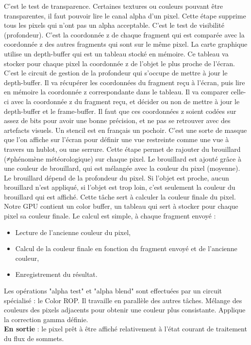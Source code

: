 C’est le test de transparence. Certaines textures ou couleurs pouvant être transparentes, il faut pouvoir lire le canal alpha d’un pixel. Cette étape supprime tous les pixels qui n’ont pas un alpha acceptable.
C’est le test de visibilité (profondeur). C’est la coordonnée z de chaque fragment qui est comparée avec la coordonnée z des autres fragments qui sont sur le même pixel. La carte graphique utilise un depth-buffer qui est un tableau stocké en mémoire. Ce tableau va stocker pour chaque pixel la coordonnée z de l’objet le plus proche de l’écran.
C’est le circuit de gestion de la profondeur qui s’occupe de mettre à jour le depth-buffer. Il va récupérer les coordonnées du fragment reçu à l’écran, puis lire en mémoire la coordonnée z correspondante dans le tableau. Il va comparer celle-ci avec la coordonnée z du fragment reçu, et décider ou non de mettre à jour le depth-buffer et le frame-buffer.
Il faut que ces coordonnées z soient codées sur assez de bits pour avoir une bonne précision, et ne pas se retrouver avec des artefacts visuels.
Un stencil est en  français un pochoir. C’est une sorte de masque que l’on affiche sur l’écran pour définir une vue restreinte comme une vue à travers un hublot, ou une serrure.
Cette étape permet de rajouter du brouillard (≠phénomène météorologique) sur chaque pixel. Le brouillard est ajouté grâce à une couleur de brouillard, qui est mélangée avec la couleur du pixel (moyenne). Le brouillard dépend de la profondeur du pixel. Si l’objet est proche, aucun brouillard n’est appliqué, si l’objet est trop loin, c’est seulement la couleur du brouillard qui est affiché.
Cette tâche sert à calculer la couleur finale du pixel. Notre GPU contient un color buffer, un tableau qui sert à stocker pour chaque pixel sa couleur finale.
Le calcul est simple, à chaque fragment envoyé :
\begin{itemize}
	\item Lecture de l’ancienne couleur du pixel,
	\item Calcul de la couleur finale en fonction du fragment envoyé et de l’ancienne couleur,
	\item Enregistrement du résultat.
\end{itemize}
Les opérations "alpha test" et "alpha blend" sont effectuées par un circuit spécialisé : le Color ROP. Il travaille en parallèle des autres tâches.
Mélange des couleurs des pixels adjacents pour obtenir une couleur plus consistante.
Applique la correction gamma définie.\\
\textbf{En sortie} : le pixel prêt à être affiché relativement à l'état courant de traitement du flux de sommets.

